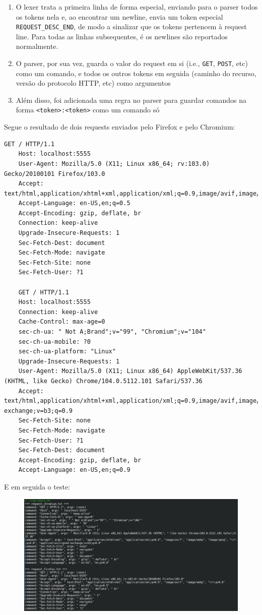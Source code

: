\documentclass{article}
\begin{document}
\begin{enumerate}
    \item O lexer trata a primeira linha de forma especial, enviando para o parser todos os tokens nela e, ao encontrar um newline, envia um token especial \texttt{REQUEST\_DESC\_END}, de modo a sinalizar que os tokens pertencem à request line. Para todas as linhas subsequentes, é os newlines são reportados normalmente.
    \item O parser, por sua vez, guarda o valor do request em si (i.e., \texttt{GET}, \texttt{POST}, etc) como um comando, e todos os outros tokens em seguida (caminho do recurso, versão do protocolo HTTP, etc) como argumentos
    \item Além disso, foi adicionada uma regra no parser para guardar comandos na forma \texttt{<token>:<token>} como um comando só
\end{enumerate}

Segue o resultado de dois requests enviados pelo Firefox e pelo Chromium:

\begin{lstlisting}[breaklines]
    GET / HTTP/1.1
    Host: localhost:5555
    User-Agent: Mozilla/5.0 (X11; Linux x86_64; rv:103.0) Gecko/20100101 Firefox/103.0
    Accept: text/html,application/xhtml+xml,application/xml;q=0.9,image/avif,image/webp,*/*;q=0.8
    Accept-Language: en-US,en;q=0.5
    Accept-Encoding: gzip, deflate, br
    Connection: keep-alive
    Upgrade-Insecure-Requests: 1
    Sec-Fetch-Dest: document
    Sec-Fetch-Mode: navigate
    Sec-Fetch-Site: none
    Sec-Fetch-User: ?1

    GET / HTTP/1.1
    Host: localhost:5555
    Connection: keep-alive
    Cache-Control: max-age=0
    sec-ch-ua: " Not A;Brand";v="99", "Chromium";v="104"
    sec-ch-ua-mobile: ?0
    sec-ch-ua-platform: "Linux"
    Upgrade-Insecure-Requests: 1
    User-Agent: Mozilla/5.0 (X11; Linux x86_64) AppleWebKit/537.36 (KHTML, like Gecko) Chrome/104.0.5112.101 Safari/537.36
    Accept: text/html,application/xhtml+xml,application/xml;q=0.9,image/avif,image/webp,image/apng,*/*;q=0.8,application/signed-exchange;v=b3;q=0.9
    Sec-Fetch-Site: none
    Sec-Fetch-Mode: navigate
    Sec-Fetch-User: ?1
    Sec-Fetch-Dest: document
    Accept-Encoding: gzip, deflate, br
    Accept-Language: en-US,en;q=0.9
\end{lstlisting}

E em seguida o teste:

\begin{figure}[!ht]
    \begin{center}
        \includegraphics[width=\textwidth]{images/tests.png}
    \end{center}
\end{figure} 
\end{document}
